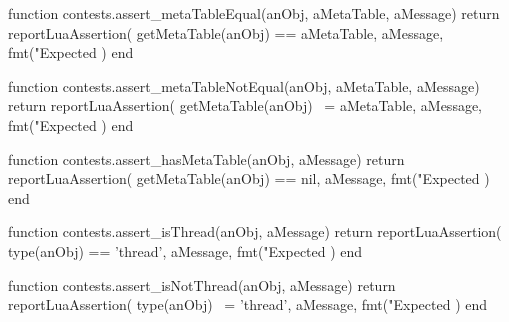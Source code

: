 \stopTestSuite


\startLuaCode
function contests.assert_metaTableEqual(anObj, aMetaTable, aMessage)
  return reportLuaAssertion(
    getMetaTable(anObj) == aMetaTable,
    aMessage,
    fmt("Expected %
  )
end
\stopLuaCode

\stopTestSuite


\startLuaCode
function contests.assert_metaTableNotEqual(anObj, aMetaTable, aMessage)
  return reportLuaAssertion(
    getMetaTable(anObj) ~= aMetaTable,
    aMessage,
    fmt("Expected %
  )
end
\stopLuaCode

\stopTestSuite


\startLuaCode
function contests.assert_hasMetaTable(anObj, aMessage)
  return reportLuaAssertion(
    getMetaTable(anObj) == nil,
    aMessage,
    fmt("Expected %
  )
end
\stopLuaCode

\stopTestSuite


\startLuaCode
function contests.assert_isThread(anObj, aMessage)
  return reportLuaAssertion(
    type(anObj) == 'thread',
    aMessage,
    fmt("Expected %
  )
end
\stopLuaCode

\stopTestSuite


\startLuaCode
function contests.assert_isNotThread(anObj, aMessage)
  return reportLuaAssertion(
    type(anObj) ~= 'thread',
    aMessage,
    fmt("Expected %
  )
end
\stopLuaCode

\stopTestSuite

\stopchapter